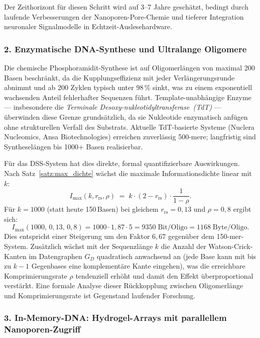 ﻿\documentclass[a4paper,12pt]{article}
\theoremstyle{definition}
\begin{document}
Der Zeithorizont f\"{u}r diesen Schritt wird auf 3--7 Jahre gesch\"{a}tzt,
bedingt durch laufende Verbesserungen der Nanoporen-Pore-Chemie und
tieferer Integration neuronaler Signalmodelle in Echtzeit-Auslesehardware.

\subsubsection*{2.\; Enzymatische DNA-Synthese und Ultralange Oligomere}

Die chemische Phosphoramidit-Synthese ist auf Oligomerl\"{a}ngen von maximal
200\,Basen beschr\"{a}nkt, da die Kupplungseffizienz mit jeder Verl\"{a}ngerungsrunde
abnimmt und ab 200 Zyklen typisch unter 98\,\% sinkt, was zu einem
exponentiell wachsenden Anteil fehlerhafter Sequenzen f\"{u}hrt.
Template-unabh\"{a}ngige Enzyme --- insbesondere die
\emph{Terminale Desoxy-nukleotidyltransferase~(TdT)} --- \"{u}berwinden
diese Grenze grunds\"{a}tzlich, da sie Nukleotide enzymatisch anf\"{u}gen
ohne strukturellen Verfall des Substrats.
Aktuelle TdT-basierte Systeme (Nuclera Nucleomics, Ansa Biotechnologies)
erreichen zuverl\"{a}ssig 500-mere; langfristig sind Synthesel\"{a}ngen
bis 1000+ Basen realisierbar.

F\"{u}r das DSS-System hat dies direkte, formal quantifizierbare Auswirkungen.
Nach Satz~\ref{satz:max_dichte} w\"{a}chst die maximale Informationsdichte
linear mit~$k$:
\[
    I_{\max}(k, r_{\mathrm{rs}}, \rho) \;=\;
    k \cdot (2 - r_{\mathrm{rs}}) \cdot \frac{1}{1-\rho}.
\]
F\"{u}r $k = 1000$ (statt heute 150\,Basen) bei gleichem
$r_{\mathrm{rs}} = 0{,}13$ und $\rho = 0{,}8$ ergibt sich:
\[
    I_{\max}(1000,\, 0{,}13,\, 0{,}8) = 1000 \cdot 1{,}87 \cdot 5
    = 9350 \;\text{Bit/Oligo} = 1168 \;\text{Byte/Oligo}.
\]
Dies entspricht einer Steigerung um den Faktor $6{,}67$ gegen\"{u}ber dem
150-mer-System.
Zus\"{a}tzlich w\"{a}chst mit der Sequenzl\"{a}nge $k$ die Anzahl der
Watson-Crick-Kanten im Datengraphen $G_D$ quadratisch anwachsend an
(jede Base kann mit bis zu $k-1$ Gegenbases eine komplementäre
Kante eingehen), was die erreichbare Komprimierungsrate $\rho$ tendenziell
erh\"{o}ht und damit den Effekt \"{u}berproportional verst\"{a}rkt.
Eine formale Analyse dieser R\"{u}ckkopplung zwischen Oligomerl\"{a}nge
und Komprimierungsrate ist Gegenstand laufender Forschung.

\subsubsection*{3.\; In-Memory-DNA: Hydrogel-Arrays mit parallellem Nanoporen-Zugriff}
\end{document}
